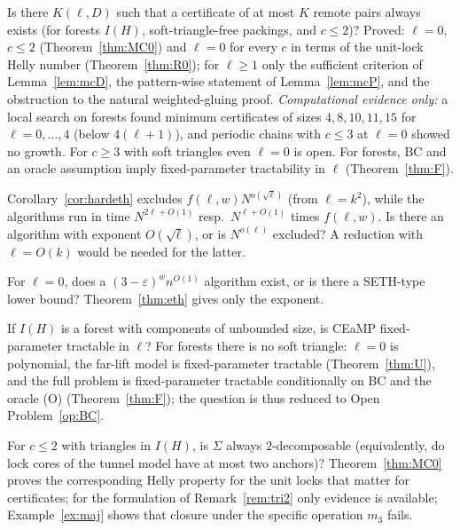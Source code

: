 \begin{problem}\label{op:BC}\label{op:mincert}
Is there $K(\ell,D)$ such that a certificate of at most $K$ remote pairs always exists (for forests $I(H)$, soft-triangle-free packings, and $c\le2$)? Proved: $\ell=0$, $c\le2$ (Theorem~\ref{thm:MC0}) and $\ell=0$ for every $c$ in terms of the unit-lock Helly number (Theorem~\ref{thm:R0}); for $\ell\ge1$ only the sufficient criterion of Lemma~\ref{lem:mcD}, the pattern-wise statement of Lemma~\ref{lem:mcP}, and the obstruction to the natural weighted-gluing proof. \emph{Computational evidence only:} a local search on forests found minimum certificates of sizes $4,8,10,11,15$ for $\ell=0,\dots,4$ (below $4(\ell+1)$), and periodic chains with $c\le3$ at $\ell=0$ showed no growth. For $c\ge3$ with soft triangles even $\ell=0$ is open. For forests, BC and an oracle assumption imply fixed-parameter tractability in $\ell$ (Theorem~\ref{thm:F}).
\end{problem}
\begin{problem}\label{op:eth}
Corollary~\ref{cor:hardeth} excludes $f(\ell,w)N^{o(\sqrt\ell)}$ (from $\ell=k^2$), while the algorithms run in time $N^{2\ell+O(1)}$ resp.\ $N^{\ell+O(1)}$ times $f(\ell,w)$. Is there an algorithm with exponent $O(\sqrt\ell)$, or is $N^{o(\ell)}$ excluded? A reduction with $\ell=O(k)$ would be needed for the latter.
\end{problem}
\begin{problem}\label{op:seth}
For $\ell=0$, does a $(3-\varepsilon)^{w}n^{O(1)}$ algorithm exist, or is there a SETH-type lower bound? Theorem~\ref{thm:eth} gives only the exponent.
\end{problem}
\begin{problem}[$w=1$ with unbounded tree components]\label{op:forest}
If $I(H)$ is a forest with components of unbounded size, is CEaMP fixed-parameter tractable in $\ell$? For forests there is no soft triangle: $\ell=0$ is polynomial, the far-lift model is fixed-parameter tractable (Theorem~\ref{thm:U}), and the full problem is fixed-parameter tractable conditionally on BC and the oracle (O) (Theorem~\ref{thm:F}); the question is thus reduced to Open Problem~\ref{op:BC}.
\end{problem}
\begin{problem}\label{op:tri2}
For $c\le2$ with triangles in $I(H)$, is $\Sigma$ always $2$-decomposable (equivalently, do lock cores of the tunnel model have at most two anchors)? Theorem~\ref{thm:MC0} proves the corresponding Helly property for the unit locks that matter for certificates; for the formulation of Remark~\ref{rem:tri2} only evidence is available; Example~\ref{ex:maj} shows that closure under the specific operation $m_3$ fails.
\end{problem}
